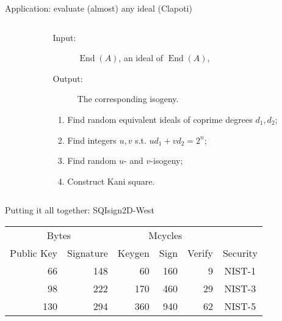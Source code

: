 \documentclass[aspectratio=169]{beamer}
\newcommand{\End}{\operatorname{End}}
\begin{document}
\begin{frame}{Application: evaluate (almost) any ideal (Clapoti)}
  \large
  \begin{columns}
    \begin{column}{0.4\textwidth}
      \centering
    \end{column}
    \begin{column}{0.6\textwidth}
      \begin{description}
      \item[Input:] $\End(A)$, an ideal of $\End(A)$,
      \item[Output:] The corresponding isogeny.
      \end{description}
      \begin{enumerate}
      \item Find random equivalent ideals of coprime degrees
        \emph{$d_1,d_2$};
      \item<2-> Find integers $u,v$ s.t. \emph{$ud_1 + vd_2 = 2^n$};
      \item<2-> Find random $u$- and $v$-isogeny;
      \item<3-> Construct Kani square.
      \end{enumerate}
    \end{column}  
  \end{columns}  
\end{frame}


\begin{frame}{Putting it all together: SQIsign2D-West}
  \begin{table}[h]
    \centering
    \begin{tabular}{ r r | r r r | c }
      \multicolumn{2}{c|}{Bytes} & \multicolumn{3}{c|}{Mcycles}\\
      Public Key & Signature & Keygen & Sign & Verify & Security \\
      \hline
      66 & 148 & 60 & 160 & 9 & NIST-1 \\
      98 & 222 & 170 & 460 & 29 & NIST-3 \\
      130 & 294 & 360 & 940 & 62 & NIST-5 \\
    \end{tabular}
  \end{table}
\end{frame}
\end{document}
